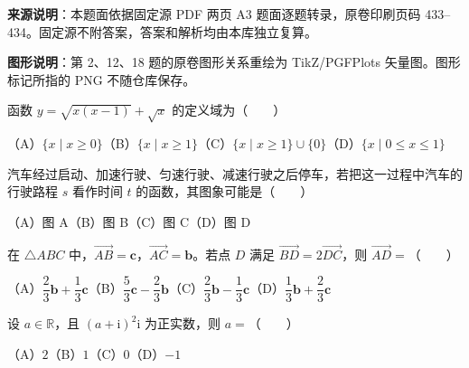 


\begin{gktip}
\textbf{来源说明}：本题面依据固定源 PDF 两页 A3 题面逐题转录，原卷印刷页码 433–434。固定源不附答案，答案和解析均由本库独立复算。

\textbf{图形说明}：第 2、12、18 题的原卷图形关系重绘为 TikZ/PGFPlots 矢量图。图形标记所指的 PNG 不随仓库保存。
\end{gktip}


\begin{question}
函数 $y=\sqrt{x(x-1)}+\sqrt{x}$ 的定义域为\mbox{（　　）}

（A）$\{x\mid x\geqslant0\}$\quad（B）$\{x\mid x\geqslant1\}$\quad（C）$\{x\mid x\geqslant1\}\cup\{0\}$\quad（D）$\{x\mid0\leqslant x\leqslant1\}$

\Needspace{0.4\textheight}
\end{question}
\begin{question}
汽车经过启动、加速行驶、匀速行驶、减速行驶之后停车，若把这一过程中汽车的行驶路程 $s$ 看作时间 $t$ 的函数，其图象可能是\mbox{（　　）}
\nopagebreak[4]
\begin{center}\end{center}
\nopagebreak[4]
（A）图 A\quad（B）图 B\quad（C）图 C\quad（D）图 D

\end{question}
\begin{question}
在 $\triangle ABC$ 中，$\overrightarrow{AB}=\boldsymbol c$，$\overrightarrow{AC}=\boldsymbol b$。若点 $D$ 满足 $\overrightarrow{BD}=2\overrightarrow{DC}$，则 $\overrightarrow{AD}=$\mbox{（　　）}

（A）$\dfrac23\boldsymbol b+\dfrac13\boldsymbol c$\quad（B）$\dfrac53\boldsymbol c-\dfrac23\boldsymbol b$\quad（C）$\dfrac23\boldsymbol b-\dfrac13\boldsymbol c$\quad（D）$\dfrac13\boldsymbol b+\dfrac23\boldsymbol c$

\end{question}
\begin{question}
设 $a\in\mathbb R$，且 $(a+\mathrm i)^2\mathrm i$ 为正实数，则 $a=$\mbox{（　　）}

（A）$2$\quad（B）$1$\quad（C）$0$\quad（D）$-1$

\end{question}
